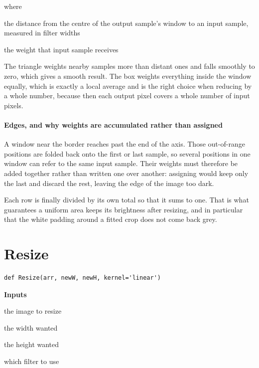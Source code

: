 \noindent where
\begin{description}[leftmargin=2.4em,style=nextline,font=\normalfont\ttfamily]\setlength\itemsep{1pt}
  \item[{$t$}] \normalfont the distance from the centre of the output sample's window to an input sample, measured in filter widths
  \item[{$w(t)$}] \normalfont the weight that input sample receives
\end{description}
The triangle weights nearby samples more than distant ones and falls smoothly to zero, which gives a smooth result. The box weights everything inside the window equally, which is exactly a local average and is the right choice when reducing by a whole number, because then each output pixel covers a whole number of input pixels.


\paragraph{Edges, and why weights are accumulated rather than assigned}
A window near the border reaches past the end of the axis. Those out-of-range positions are folded back onto the first or last sample, so several positions in one window can refer to the same input sample. Their weights must therefore be added together rather than written one over another: assigning would keep only the last and discard the rest, leaving the edge of the image too dark.

Each row is finally divided by its own total so that it sums to one. That is what guarantees a uniform area keeps its brightness after resizing, and in particular that the white padding around a fitted crop does not come back grey.


\section{Resize}
\begin{lstlisting}[style=sig]
def Resize(arr, newW, newH, kernel='linear')
\end{lstlisting}

\noindent\textbf{Inputs}
\begin{description}[leftmargin=2.2em,style=nextline,font=\normalfont\ttfamily]\setlength\itemsep{1pt}
  \item[{img}] \normalfont the image to resize
  \item[{newW}] \normalfont the width wanted
  \item[{newH}] \normalfont the height wanted
  \item[{kernel}] \normalfont which filter to use
\end{description}

